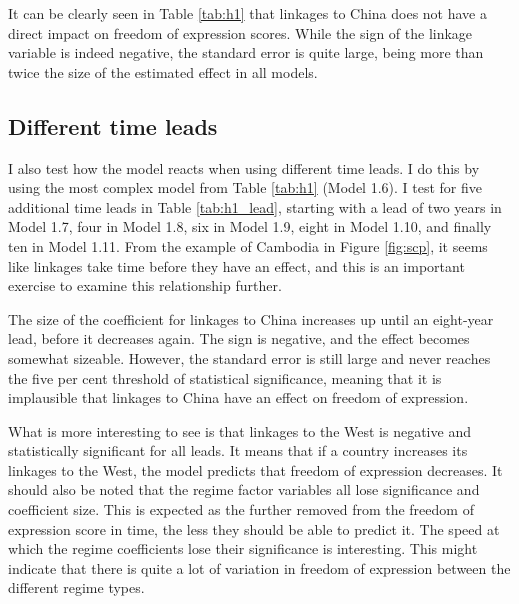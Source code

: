 It can be clearly seen in Table \ref{tab:h1} that linkages to China does not have a direct impact on freedom of expression scores. While the sign of the linkage variable is indeed negative, the standard error is quite large, being more than twice the size of the estimated effect in all models.

\subsection{Different time leads}
I also test how the model reacts when using different time leads. I do this by using the most complex model from Table \ref{tab:h1} (Model 1.6). I test for five additional time leads in Table \ref{tab:h1_lead}, starting with a lead of two years in Model 1.7, four in Model 1.8, six in Model 1.9, eight in Model 1.10, and finally ten in Model 1.11. From the example of Cambodia in Figure \ref{fig:scp}, it seems like linkages take time before they have an effect, and this is an important exercise to examine this relationship further.

The size of the coefficient for linkages to China increases up until an eight-year lead, before it decreases again. The sign is negative, and the effect becomes somewhat sizeable. However, the standard error is still large and never reaches the five per cent threshold of statistical significance, meaning that it is implausible that linkages to China have an effect on freedom of expression. 

What is more interesting to see is that linkages to the West is negative and statistically significant for all leads. It means that if a country increases its linkages to the West, the model predicts that freedom of expression decreases. It should also be noted that the regime factor variables all lose significance and coefficient size. This is expected as the further removed from the freedom of expression score in time, the less they should be able to predict it. The speed at which the regime coefficients lose their significance is interesting. This might indicate that there is quite a lot of variation in freedom of expression between the different regime types.

